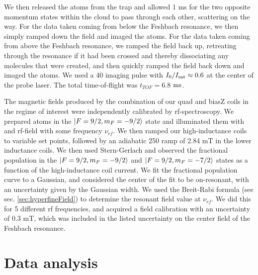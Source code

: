 We then released the atoms from the trap and allowed 1 ms for the two opposite momentum states within the cloud to pass through each other, scattering on the way. For the data taken coming from below the Feshbach resonance, we then simply ramped down the field and imaged the atoms. For the data taken coming from above the Feshbach resonance, we ramped the field back up, retreating through the resonance if it had been crossed and thereby dissociating any molecules that were created, and then quickly ramped the field back down and imaged the atoms. We used a 40 \us{} imaging pulse with $I_0/I_{\rm{sat}}\approx 0.6$ at the center of the probe laser. The total time-of-flight was $t_{TOF}=6.8$ $\rm{ms}$.

The magnetic fields produced by the combination of our quad and biasZ coils in the regime of interest were independently calibrated by rf-spectroscopy. We prepared \K{} atoms in the $\mathinner{|{F=9/2, m_F=-9/2}\rangle}$ state and illuminated them with and rf-field with some frequency $\nu_{rf}$. We then ramped our high-inductance coils to variable set points, followed by an adiabatic 250\us{} ramp of 2.84 mT in the lower inductance coils. We then used Stern-Gerlach and observed the fractional population in the $\mathinner{|{F=9/2, m_F=-9/2}\rangle}$  and $\mathinner{|{F=9/2, m_F=-7/2}\rangle}$ states as a function of the high-inductance coil current. We fit the fractional population curve to a Gaussian, and considered the center of the fit to be on-resonant, with an uncertainty given by the Gaussian width. We used the Breit-Rabi formula (see sec. \ref{sec:hyperfineField}) to determine the resonant field value at $\nu_{rf}$. We did this for 5 different rf frequencies, and acquired a field calibration with an uncertainty of 0.3 mT, which was included in the listed uncertainty on the center field of the Feshbach resonance.


\section{Data analysis}

